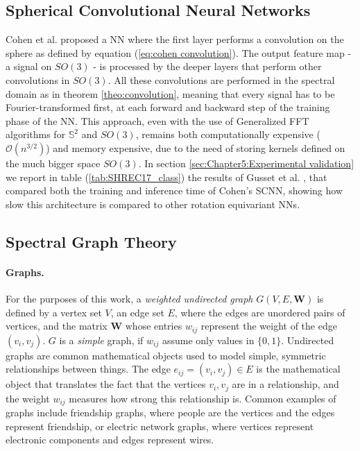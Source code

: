 \subsection{Spherical Convolutional Neural Networks}\label{sec:Chapter1:SCNN}
Cohen et al. \cite{SCNN} proposed a NN where the first layer performs a convolution on the sphere as defined by equation (\ref{eq:cohen convolution}). The output feature map - a signal on $SO(3)$ - is processed by the deeper layers that perform other convolutions in $SO(3)$. All these convolutions are performed in the spectral domain as in theorem \ref{theo:convolution}, meaning that every signal has to be Fourier-transformed first, at each forward and backward step of the training phase of the NN. This approach, even with the use of Generalized FFT algorithms for $\mathbb S^2$ and $SO(3)$, remains both computationally expensive ($\mathcal O(n^{3/2})$) and memory expensive, due to the need of storing kernels defined on the much bigger space $SO(3)$. In section \ref{sec:Chapter5:Experimental validation} we report in table (\ref{tab:SHREC17_class}) the results of Gusset et al. \cite{Gusset}, that compared both the training and inference time of Cohen's SCNN, showing how slow this architecture is compared to other rotation equivariant NNs.
\subsection{Spectral Graph Theory} \label{sec:Chapter1: Spectral Graph Theory}
\paragraph{Graphs.}
For the purposes of this work, a \textit{weighted undirected graph} $G(V, E, \mathbf W)$ is defined by a vertex set $V$, an edge set $E$, where the edges are unordered pairs of vertices, and the matrix $\mathbf W$ whose entries $w_{ij}$ represent the weight of the edge $(v_i, v_j)$. $G$ is a \textit{simple} graph, if $w_{ij}$ assume only values in $\{0, 1\}$. Undirected graphs are common mathematical objects used to model simple, symmetric relationships between things. The edge $e_{ij} = (v_i, v_j) \in E$ is the mathematical object that translates the fact that the vertices $v_i, v_j$ are in a relationship, and the weight $w_{ij}$ measures how strong this relationship is. Common examples of graphs include friendship graphs, where people are the vertices and the edges represent friendship, or electric network graphs, where vertices represent electronic components and edges represent wires.
